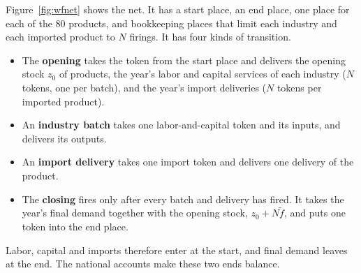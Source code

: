 \documentclass[11pt]{article}
\begin{document}
Figure~\ref{fig:wfnet} shows the net. It has a start place, an end place, one place for each of the 80 products, and bookkeeping places that limit each industry and each imported product to $N$ firings. It has four kinds of transition.
\begin{itemize}[leftmargin=*]
\item The \textbf{opening} takes the token from the start place and delivers the opening stock $z_0$ of products, the year's labor and capital services of each industry ($N$ tokens, one per batch), and the year's import deliveries ($N$ tokens per imported product).
\item An \textbf{industry batch} takes one labor-and-capital token and its inputs, and delivers its outputs.
\item An \textbf{import delivery} takes one import token and delivers one delivery of the product.
\item The \textbf{closing} fires only after every batch and delivery has fired. It takes the year's final demand together with the opening stock, $z_0+N\tilde f$, and puts one token into the end place.
\end{itemize}
Labor, capital and imports therefore enter at the start, and final demand leaves at the end. The national accounts make these two ends balance.
\end{document}
